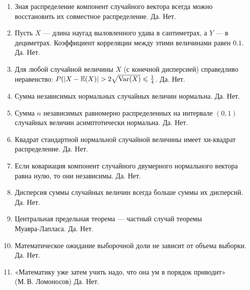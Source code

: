 \documentclass[12pt, a4paper]{article}\usepackage[]{graphicx}\usepackage[]{color}
\begin{document}
				\begin{enumerate}
					\item{Зная распределение компонент случайного вектора всегда можно восстановить их совместное распределение. Да. Нет.}

					\item{Пусть $X$ — длина наугад выловленного удава в сантиметрах, а $Y$ — в дециметрах. Коэффициент корреляции между этими величинами равен $0.1$. Да. Нет.}

					\item{Для любой случайной величины $X$ (с конечной дисперсией) справедливо неравенство: $P(|X-\E(X)|>2\sqrt{\Var(X)}\leqslant \frac{1}{4}$. Да. Нет.}

					\item{Сумма независимых нормальных случайных величин нормальна. Да. Нет.}

					\item{Сумма $n$ независимых равномерно распределенных на интервале $(0,1)$ случайных величин асимптотически нормальна. Да. Нет.}

					\item{Квадрат стандартной нормальной случайной величины имеет хи-квадрат распределение. Да. Нет.}

					\item{Если ковариация компонент случайного двумерного нормального вектора равна нулю, то они независимы. Да. Нет.}

					\item{Дисперсия суммы случайных величин всегда больше суммы их дисперсий. Да. Нет.}

					\item{Центральная предельная теорема –-- частный случай теоремы \\Муавра-Лапласа. Да. Нет.}

					\item{Математическое ожидание выборочной доли не зависит от объема выборки. Да. Нет.}

					\item{«Математику уже затем учить надо, что она ум в порядок приводит» \\ (М.\,В. Ломоносов) Да. Нет.}

				\end{enumerate}
\end{document}

